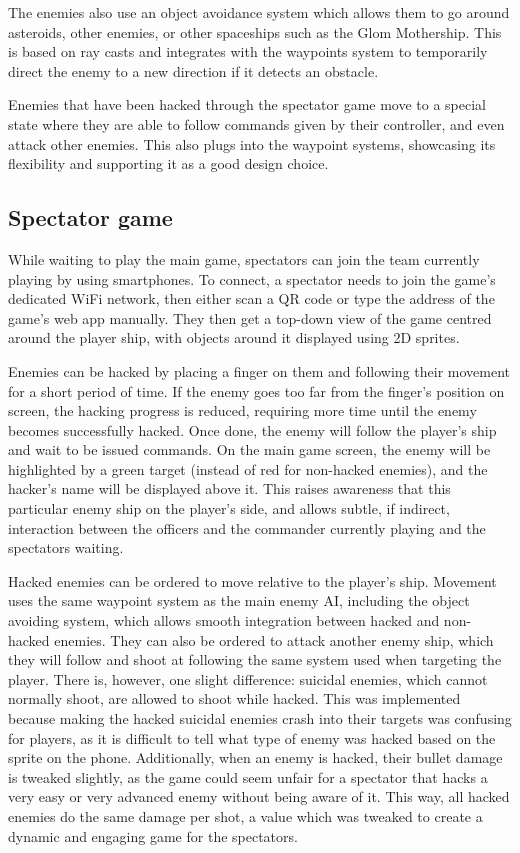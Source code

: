 \documentclass[a4paper,11pt]{article}
\begin{document}
The enemies also use an object avoidance system which allows them to go around asteroids, other enemies, or other spaceships such as the Glom Mothership. This is based on ray casts and integrates with the waypoints system to temporarily direct the enemy to a new direction if it detects an obstacle.

Enemies that have been hacked through the spectator game move to a special state where they are able to follow commands given by their controller, and even attack other enemies. This also plugs into the waypoint systems, showcasing its flexibility and supporting it as a good design choice.

\subsection{Spectator game}
While waiting to play the main game, spectators can join the team currently playing by using smartphones. To connect, a spectator needs to join the game’s dedicated WiFi network, then either scan a QR code or type the address of the game’s web app manually. They then get a top-down view of the game centred around the player ship, with objects around it displayed using 2D sprites.

Enemies can be hacked by placing a finger on them and following their movement for a short period of time. If the enemy goes too far from the finger’s position on screen, the hacking progress is reduced, requiring more time until the enemy becomes successfully hacked. Once done, the enemy will follow the player’s ship and wait to be issued commands. On the main game screen, the enemy will be highlighted by a green target (instead of red for non-hacked enemies), and the hacker’s name will be displayed above it. This raises awareness that this particular enemy ship on the player’s side, and allows subtle, if indirect, interaction between the officers and the commander currently playing and the spectators waiting.

Hacked enemies can be ordered to move relative to the player’s ship. Movement uses the same waypoint system as the main enemy AI, including the object avoiding system, which allows smooth integration between hacked and non-hacked enemies. They can also be ordered to attack another enemy ship, which they will follow and shoot at following the same system used when targeting the player. There is, however, one slight difference: suicidal enemies, which cannot normally shoot, are allowed to shoot while hacked. This was implemented because making the hacked suicidal enemies crash into their targets was confusing for players, as it is difficult to tell what type of enemy was hacked based on the sprite on the phone. Additionally, when an enemy is hacked, their bullet damage is tweaked slightly, as the game could seem unfair for a spectator that hacks a very easy or very advanced enemy without being aware of it. This way, all hacked enemies do the same damage per shot, a value which was tweaked to create a dynamic and engaging game for the spectators.
\end{document}
